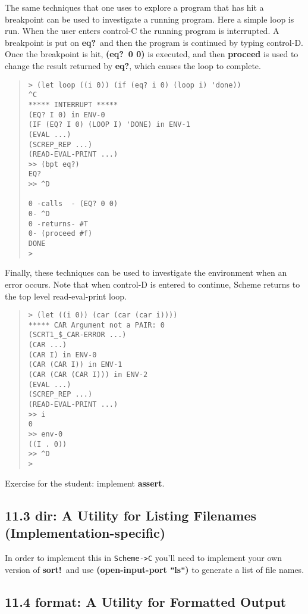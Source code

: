 \documentclass[10pt]{article}
\begin{document}
The same techniques that one uses to explore a program that
has hit a breakpoint can be used to investigate a running
program.  Here a simple loop is run.  When the user enters
control-C the running program is interrupted.  A breakpoint is
put on \textbf{eq?}\ and then the program is continued by typing
control-D.  Once the breakpoint is hit, \textbf{(eq?\ 0 0)} is
executed, and then \textbf{proceed} is used to change the result
returned by \textbf{eq?}, which causes the loop to complete.

\begin{quote}
\begin{verbatim}
> (let loop ((i 0)) (if (eq? i 0) (loop i) 'done))
^C
***** INTERRUPT *****
(EQ? I 0) in ENV-0
(IF (EQ? I 0) (LOOP I) 'DONE) in ENV-1
(EVAL ...)
(SCREP_REP ...)
(READ-EVAL-PRINT ...)
>> (bpt eq?)
EQ?
>> ^D

0 -calls  - (EQ? 0 0)
0- ^D
0 -returns- #T
0- (proceed #f)
DONE
>
\end{verbatim}
\end{quote}

Finally, these techniques can be used to investigate the
environment when an error occurs.  Note that when control-D is
entered to continue, Scheme returns to the top level
read-eval-print loop.

\begin{quote}
\begin{verbatim}
> (let ((i 0)) (car (car (car i))))
***** CAR Argument not a PAIR: 0
(SCRT1_$_CAR-ERROR ...)
(CAR ...)
(CAR I) in ENV-0
(CAR (CAR I)) in ENV-1
(CAR (CAR (CAR I))) in ENV-2
(EVAL ...)
(SCREP_REP ...)
(READ-EVAL-PRINT ...)
>> i
0
>> env-0
((I . 0))
>> ^D
>
\end{verbatim}
\end{quote}

Exercise for the student:  implement \textbf{assert}.

\subsection*{11.3 dir: A Utility for Listing Filenames (Implementation-specific)}

In order to implement this in \texttt{Scheme->C} you'll need to implement your
own version of \textbf{sort!}\ and use \textbf{(open-input-port \texttt{"}ls\texttt{"})} to generate a
list of file names.

\subsection*{11.4 format: A Utility for Formatted Output}
\end{document}
